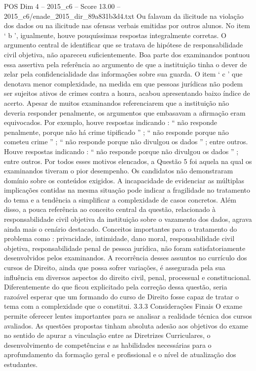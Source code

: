 \begin{textsample}{POS Dim 4 – 2015\_c6 – Score 13.00 – 2015\_c6/enade\_2015\_dir\_89a831b3d4.txt}
Ou falavam da ilicitude na violação dos dados ou na ilicitude nas ofensas verbais emitidas por outros alunos.
No item ‘ b ’, igualmente, houve pouquíssimas respostas integralmente corretas.
O argumento central de identificar que se tratava de hipótese de responsabilidade civil objetiva, não apareceu suficientemente.
Boa parte dos examinandos pontuou essa assertiva pela referência ao argumento de que a instituição tinha o dever de zelar pela confidencialidade das informações sobre sua guarda.
O item ‘ c ’ que denotava menor complexidade, na medida em que pessoas jurídicas não podem ser sujeitos ativos de crimes contra a honra, acabou apresentando baixo índice de acerto.
Apesar de muitos examinandos referenciarem que a instituição não deveria responder penalmente, os argumentos que embasavam a afirmação eram equivocados.
Por exemplo, houve respostas indicando : “ não responde penalmente, porque não há crime tipificado ” ; “ não responde porque não cometeu crime ” ; “ não responde porque não divulgou os dados ” ; entre outros.
Houve respostas indicando : “ não responde porque não divulgou os dados ” ; entre outros.
Por todos esses motivos elencados, a Questão 5 foi aquela na qual os examinandos tiveram o pior desempenho.
Os candidatos não demonstraram domínio sobre os conteúdos exigidos.
A incapacidade de evidenciar as múltiplas implicações contidas na mesma situação pode indicar a fragilidade no tratamento do tema e a tendência a simplificar a complexidade de casos concretos.
Além disso, a pouca referência ao conceito central da questão, relacionado à responsabilidade civil objetiva da instituição sobre o vazamento dos dados, agrava ainda mais o cenário destacado.
Conceitos importantes para o tratamento do problema como : privacidade, intimidade, dano moral, responsabilidade civil objetiva, responsabilidade penal de pessoa jurídica, não foram satisfatoriamente desenvolvidos pelos examinandos.
A recorrência desses assuntos no currículo dos cursos de Direito, ainda que possa sofrer variações, é assegurada pela sua influência em diversos aspectos do direito civil, penal, processual e constitucional.
Diferentemente do que ficou explicitado pela correção dessa questão, seria razoável esperar que um formando do curso de Direito fosse capaz de tratar o tema com a complexidade que o constitui. 3.3.3 Considerações Finais O exame permite oferecer lentes importantes para se analisar a realidade técnica dos cursos avaliados.
As questões propostas tinham absoluta adesão aos objetivos do exame no sentido de apurar a vinculação entre as Diretrizes Curriculares, o desenvolvimento de competências e as habilidades necessárias para o aprofundamento da formação geral e profissional e o nível de atualização dos estudantes.

\end{textsample}
